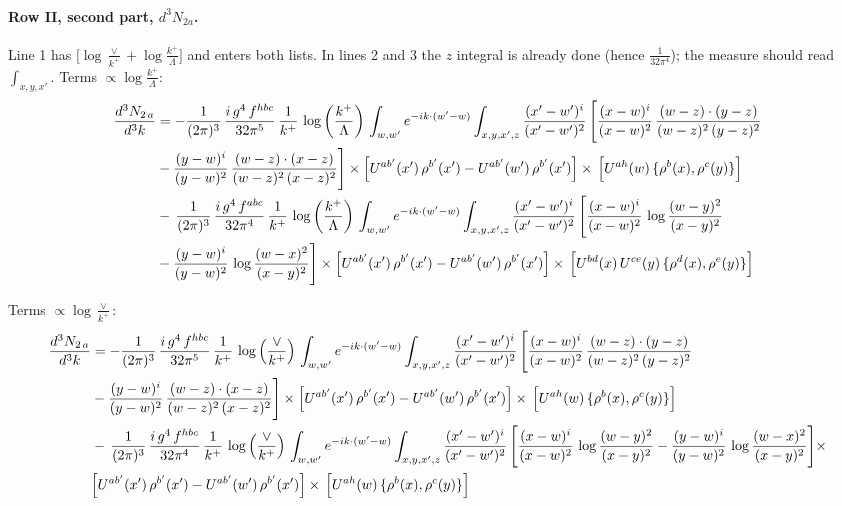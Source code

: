 \documentclass[10pt]{article}
\numberwithin{equation}{section}
\begin{document}
\paragraph{Row II, second part, $d^3N_{2a}$.}
Line 1 has $\big[\log\frac{\vee}{k^+}+\log\frac{k^+}{\Lambda}\big]$ and enters both lists. In lines 2 and 3 the $z$ integral is already done (hence $\frac{1}{32\pi^4}$); the measure should read $\int_{x,y,x'}$.
\noindent Terms $\propto\log\frac{k^+}{\Lambda}$:
\begin{align}
    \frac{d^{3}N_{2\,a}}{d^{3}k} & =  -\frac{1}{(2\pi)^{3}}\,\frac{i\,g^{4}\,f^{hbc}}{32\pi^{5}}\,\frac{1}{k^{+}}\,\log{\left(\frac{k^{+}}{\Lambda}\right)}\,
\int_{w,w'} e^{-ik\cdot(w'-w)}\int_{x,y,x',z}\frac{(x'-w')^{i}}{(x'-w')^{2}}\,\Bigg[\frac{(x-w)^{i}}{(x-w)^{2}}\, \frac{(w-z)\cdot (y-z)}{(w-z)^{2}\,(y-z)^{2}}\notag \\ & - \frac{(y-w)^{i}}{(y-w)^{2}}\, \frac{(w-z)\cdot (x-z)}{(w-z)^{2}\,(x-z)^{2}}\Bigg]\times\Big[U^{ab'}(x')\,\rho^{b'}(x')-U^{ab'}(w')\,\rho^{b'}(x')\Big]\times\, \Big[U^{ah}(w)\,\{\rho^{b}(x),\rho^{c}(y)\}\Big] \notag \\
& -\,\frac{1}{(2\pi)^{3}}\,\frac{i\,g^{4}\,f^{abc}}{32\pi^{4}}\,\frac{1}{k^{+}}\,\log{\left(\frac{k^{+}}{\Lambda}\right)}\,
\int_{w,w'} e^{-ik\cdot(w'-w)}\int_{x,y,x',z}\frac{(x'-w')^{i}}{(x'-w')^{2}}\,\Bigg[\frac{(x-w)^{i}}{(x-w)^{2}}\,\log\frac{(w-y)^{2}}{(x-y)^{2}}\notag \\ & -\frac{(y-w)^{i}}{(y-w)^{2}}\,\log\frac{(w-x)^{2}}{(x-y)^{2}}\Bigg]\times \Big[U^{ab'}(x')\,\rho^{b'}(x')-U^{ab'}(w')\,\rho^{b'}(x')\Big]\times\, \Big[U^{bd}(x)\,U^{ce}(y)\,\{\rho^{d}(x),\rho^{e}(y)\}\Big] \label{eq:J:G1II2a}
\end{align}

\noindent Terms $\propto\log\frac{\vee}{k^+}$:
\begin{align}
    \frac{d^{3}N_{2\,a}}{d^{3}k} & =  -\frac{1}{(2\pi)^{3}}\,\frac{i\,g^{4}\,f^{hbc}}{32\pi^{5}}\,\frac{1}{k^{+}}\,\log{\left(\frac{\vee}{k^{+}}\right)}\,
\int_{w,w'} e^{-ik\cdot(w'-w)}\int_{x,y,x',z}\frac{(x'-w')^{i}}{(x'-w')^{2}}\,\Bigg[\frac{(x-w)^{i}}{(x-w)^{2}}\, \frac{(w-z)\cdot (y-z)}{(w-z)^{2}\,(y-z)^{2}}\notag \\ & - \frac{(y-w)^{i}}{(y-w)^{2}}\, \frac{(w-z)\cdot (x-z)}{(w-z)^{2}\,(x-z)^{2}}\Bigg]\times\Big[U^{ab'}(x')\,\rho^{b'}(x')-U^{ab'}(w')\,\rho^{b'}(x')\Big]\times\, \Big[U^{ah}(w)\,\{\rho^{b}(x),\rho^{c}(y)\}\Big] \notag \\
& -\,\frac{1}{(2\pi)^{3}}\,\frac{i\,g^{4}\,f^{hbc}}{32\pi^{4}}\,\frac{1}{k^{+}}\,\log{\left(\frac{\vee}{k^{+}}\right)}\,
\int_{w,w'} e^{-ik\cdot(w'-w)}\int_{x,y,x',z}\frac{(x'-w')^{i}}{(x'-w')^{2}}\,\Bigg[\frac{(x-w)^{i}}{(x-w)^{2}}\,\log\frac{(w-y)^{2}}{(x-y)^{2}}-\frac{(y-w)^{i}}{(y-w)^{2}}\,\log\frac{(w-x)^{2}}{(x-y)^{2}}\Bigg]\times\notag \\ & \Big[U^{ab'}(x')\,\rho^{b'}(x')-U^{ab'}(w')\,\rho^{b'}(x')\Big]\times\, \Big[U^{ah}(w)\,\{\rho^{b}(x),\rho^{c}(y)\}\Big] \label{eq:B:G1II2a}
\end{align}
\end{document}

